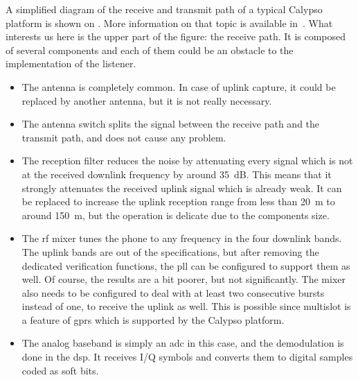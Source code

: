     A simplified diagram of the receive and transmit path of a typical
    Calypso platform is shown on .
    More information on that topic is available in~.
    What interests us here is the upper part of the figure: the
    receive path. It is composed of several components and each of
    them could be an obstacle to the implementation of the listener.

    \begin{itemize}[topsep=-1em,parsep=0em,itemsep=0.5em]

      \item The antenna is completely common. In case of uplink capture,
        it could be replaced by another antenna, but it is not really
        necessary.

      \item The antenna switch splits the signal between the receive
        path and the transmit path, and does not cause any problem.

      \item The reception filter reduces the noise by attenuating every
        signal which is not at the received downlink frequency by around
        \SI{35}{\deci\bel}. This means that it strongly attenuates the
        received uplink signal which is already weak. It can be replaced
        to increase the uplink reception range from less than
        \SI{20}{\meter} to around \SI{150}{\meter}, but the operation is
        delicate due to the components size.

      \item The \gls{rf} mixer tunes the phone to any frequency in the
        four downlink bands. The uplink bands are out of the
        specifications, but after removing the dedicated verification
        functions, the \gls{pll} can be configured to support them as
        well. Of course, the results are a bit poorer, but not
        significantly. The mixer also needs to be configured to deal with at
        least two consecutive bursts instead of one, to receive the
        uplink as well. This is possible since multislot is a feature of
        \gls{gprs} which is supported by the Calypso
        platform.

      \item The analog baseband is simply an \gls{adc} in this case, and
        the demodulation is done in the \gls{dsp}. It receives I/Q
        symbols and converts them to digital samples coded as soft
        bits.


\end{itemize}
